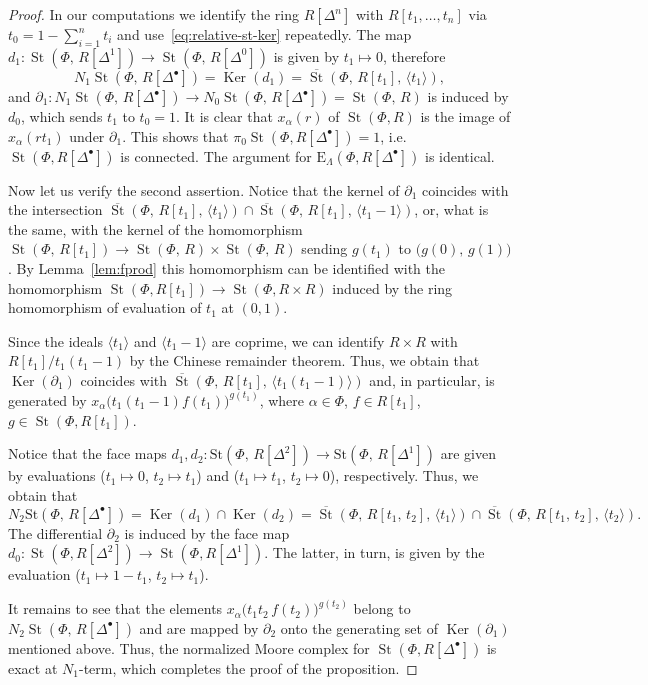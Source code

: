 \documentclass[oneside, 11pt]{amsart}
\numberwithin{equation}{section}
\newcommand{\Ker}{\mathop{\mathrm{Ker}}\nolimits}
\newcommand{\St}{\mathop{\mathrm{St}}\nolimits}
\newcommand{\E}{\mathrm{E}}
\theoremstyle{definition}
\theoremstyle{definition}
\theoremstyle{remark}
\begin{document}
\begin{proof}
In our computations we identify the ring $R[\Delta^n]$ with $R[t_1, \ldots, t_n]$ via $t_0 = 1 - \sum_{i=1}^n t_i$ and use~\eqref{eq:relative-st-ker} repeatedly.
The map $d_1\colon\St(\Phi,\,R[\Delta^1])\rightarrow\St(\Phi,\,R[\Delta^0])$ is given by $t_1\mapsto0$, therefore \[N_1\St(\Phi,\,R[\Delta^\bullet])=\Ker(d_1)=\overline{\St}(\Phi,\,R[t_1],\,\langle t_1\rangle),\]
and $\partial_1\colon N_1\St(\Phi,\,R[\Delta^\bullet])\rightarrow N_0\St(\Phi,\,R[\Delta^\bullet])=\St(\Phi,\,R)$ is induced by $d_0$, which sends $t_1$ to $t_0=1$. 
It is clear that $x_\alpha(r)$ of $\St(\Phi, R)$ is the image of $x_\alpha(rt_1)$ under $\partial_1$.
This shows that $\pi_0\St(\Phi, R[\Delta^\bullet])=1$, i.e. $\St(\Phi, R[\Delta^\bullet])$ is connected. The argument for $\E_\Lambda(\Phi, R[\Delta^\bullet])$ is identical.

Now let us verify the second assertion. Notice that the kernel of $\partial_1$ coincides with the intersection $\overline{\St}(\Phi,\,R[t_1],\,\langle t_1\rangle)\cap\overline{\St}(\Phi,\,R[t_1],\,\langle t_1-1 \rangle )$, or, what is the same, with the kernel of the homomorphism
$\St(\Phi,\,R[t_1])\rightarrow\St(\Phi,\,R)\times\St(\Phi,\,R)$
sending $g(t_1)$ to $\big(g(0),\,g(1)\big)$. By Lemma~\ref{lem:fprod} this homomorphism can be identified with the homomorphism $\St(\Phi, R[t_1]) \to \St(\Phi, R\times R)$ induced by the ring homomorphism of evaluation of $t_1$ at $(0, 1)$.

Since the ideals $\langle t_1 \rangle$ and $\langle t_1-1 \rangle$ are coprime, we can identify $R\times R$ with $R[t_1]/t_1(t_1-1)$ by the Chinese remainder theorem. Thus, we obtain that $\Ker(\partial_1)$ coincides with $\overline{\St}(\Phi,\,R[t_1],\,\langle t_1(t_1-1) \rangle)$ and, in particular, is generated by $x_\alpha\big(t_1(t_1-1)f(t_1)\big)^{g(t_1)}$, where $\alpha \in \Phi$, $f\in R[t_1]$, $g \in \St(\Phi, R[t_1])$.

Notice that the face maps $d_1, d_2\colon\mathrm{St}(\Phi,\,R[\Delta^2])\rightarrow\mathrm{St}(\Phi,\,R[\Delta^1])$ are given by evaluations ($t_1\mapsto0$, $t_2\mapsto t_1$) and ($t_1\mapsto t_1$, $t_2\mapsto0$), respectively. Thus, we obtain that \[N_2\mathrm{St}(\Phi,\,R[\Delta^\bullet])=\Ker(d_1)\cap\Ker(d_2)=\overline{\St}(\Phi,\,R[t_1,\,t_2],\,\langle t_1\rangle )\cap\overline{\St}(\Phi,\,R[t_1,\,t_2],\,\langle t_2\rangle).\]
The differential $\partial_2$ is induced by the face map $d_0 \colon \St(\Phi, R[\Delta^2]) \to \St(\Phi, R[\Delta^1])$. The latter, in turn, is given by the evaluation ($t_1 \mapsto 1-t_1$, $t_2 \mapsto t_1$).

It remains to see that the elements $x_{\alpha}\big(t_1t_2\,f(t_2)\big)^{g(t_2)}$ belong to $N_2\St(\Phi,\,R[\Delta^\bullet])$ and are mapped by $\partial_2$ onto the generating set of $\Ker(\partial_1)$ mentioned above. Thus, the normalized Moore complex for $\St(\Phi, R[\Delta^\bullet])$ is exact at $N_1$-term, which completes the proof of the proposition. \end{proof}
\end{document}
